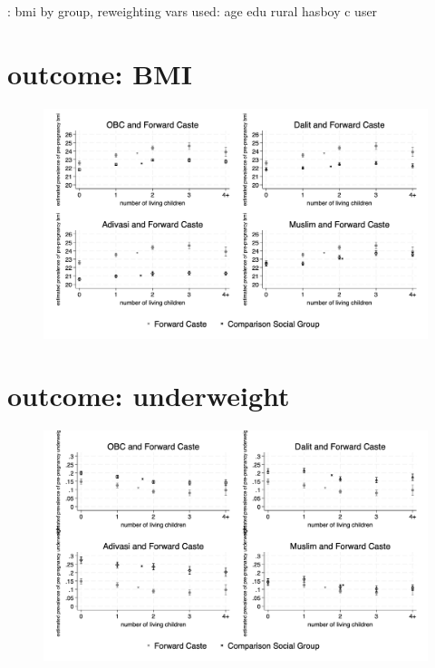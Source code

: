 \documentclass{article}
\begin{document}
\begin{table}[H]
    \centering
    \footnotesize %
    \caption{: bmi by group, reweighting vars used: age edu rural hasboy c user}
    \label{tab:sumstat}
\end{table}



\section{outcome: BMI}
\begin{figure}[H]
    \centering
    \includegraphics[width=\textwidth]{figures/prepreg_bmi_combined.png}
\end{figure}

\section{outcome: underweight}
\begin{figure}[H]
    \centering
    \includegraphics[width=\textwidth]{figures/prepreg_underweight_combined.png}
\end{figure}
\end{document}
